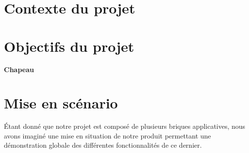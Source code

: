 \section{Contexte du projet} \label{sec:introduction}


\section{Objectifs du projet} \label{sec:objectifs}
\paragraph{Chapeau}

\section{Mise en scénario} \label{sec:miseEnScenario}

Étant donné que notre projet est composé de plusieurs briques applicatives, 
nous avons imaginé une mise en situation de notre produit permettant une 
démonstration globale des différentes fonctionnalités de ce dernier. \hfill


